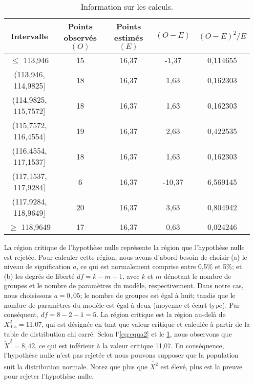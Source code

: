 \begin{table}
\centering
\caption {Information sur les calculs.} \label{tab:inf-calc}
\begin{tabular}{ccccc}
\toprule
\textbf{Intervalle} & \textbf{Points observés $(O)$} & \textbf{Points estimés $(E)$} & \textbf{$(O-E)$} & \textbf{$(O-E)^2/E$} \\
\midrule
	$\leq$ 113,946 & 15 & 16,37 & -1,37 & 0,114655 \\
	(113,946,  114,9825]  & 18 & 16,37 & 1,63 & 0,162303 \\
	(114,9825,  115,7572] & 18 & 16,37 & 1,63 & 0,162303 \\
	(115,7572,  116,4554] & 19 & 16,37 & 2,63 & 0,422535 \\
	(116,4554,  117,1537] & 18 & 16,37 & 1,63 & 0,162303 \\
	(117,1537,  117,9284] & 6 & 16,37 & -10,37 & 6,569145 \\
	(117,9284,  118,9649] & 20 & 16,37 & 3,63 & 0,804942 \\
	$\geq$ 118,9649 & 17 & 16,37 & 0,63 & 0,024246 \\
\bottomrule
\end{tabular}
\end{table}

La région critique de l'hypothèse nulle représente la région que l'hypothèse nulle est rejetée. Pour calculer cette région, nous avons d'abord besoin de choisir (a) le niveau de signification $a$, ce qui est normalement comprise entre 0,5\% et 5\%; et (b) les degrés de liberté $df = k-m-1$, avec $k$ et $m$ dénotant le nombre de groupes et le nombre de paramètres du modèle, respectivement. Dans notre cas, nous choisissons $a = 0,05$; le nombre de groupes est égal à huit; tandis que le nombre de paramètres du modèle est égal à deux (moyenne et écart-type). Par conséquent, $df = 8-2-1 = 5$. La région critique est la région au-delà de $X_{0,5}^2 = 11.07$, qui est désignée en tant que valeur critique et calculée à partir de la table de distribution chi carré. Selon l'\ref{eq:equa2} et le \ref{tab:inf-calc}, nous observons que $\tilde{X}^2 = 8,42$, ce qui est inférieur à la valeur critique 11,07. En conséquence, l'hypothèse nulle n'est pas rejetée et nous pouvons supposer que la population suit la distribution normale. Notez que plus que $\tilde {X^2}$ est élevé, plus est la preuve pour rejeter l'hypothèse nulle.

